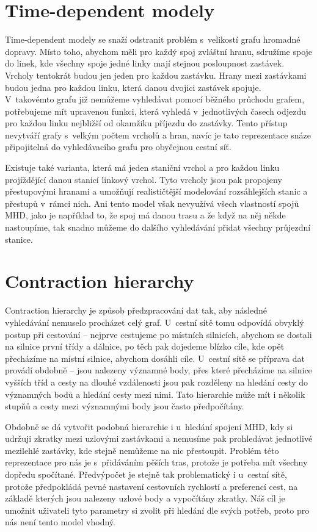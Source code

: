 \section{Time-dependent modely}
Time-dependent modely\cite{time-dependent} se snaží odstranit problém
s~velikostí grafu hromadné dopravy. Místo toho, abychom měli pro každý spoj
zvláštní hranu, sdružíme spoje do linek, kde všechny spoje jedné linky mají
stejnou posloupnost zastávek. Vrcholy tentokrát budou jen jeden pro každou
zastávku. Hrany mezi zastávkami budou jedna pro každou linku, která danou
dvojici zastávek spojuje. V~takovémto grafu již nemůžeme vyhledávat pomocí
běžného průchodu grafem, potřebujeme mít upravenou funkci, která vyhledá
v~jednotlivých časech odjezdu pro každou linku nejbližší od okamžiku příjezdu do
zastávky. Tento přístup nevytváří grafy s~velkým počtem vrcholů a hran, navíc je
tato reprezentace snáze připojitelná do vyhledávacího grafu pro obyčejnou cestní
síť.

Existuje také varianta, která má jeden staniční vrchol a
pro každou linku projíždějící danou stanicí linkový vrchol. Tyto vrcholy jsou
pak propojeny přestupovými hranami a umožňují realističtější modelování
rozsáhlejších stanic a přestupů v~rámci nich. Ani tento model však nevyužívá
všech vlastností spojů MHD, jako je například to, že spoj má danou trasu a že
když na něj někde nastoupíme, tak snadno můžeme do dalšího vyhledávání přidat všechny
průjezdní stanice.  

\section{Contraction hierarchy}
Contraction hierarchy\cite{CH} je způsob předzpracování dat tak, aby následné
vyhledávání nemuselo procházet celý graf. U~cestní sítě tomu odpovídá obvyklý
postup při cestování -- nejprve cestujeme po místních silnicích, abychom se
dostali na silnice první třídy a dálnice, po těch pak dojedeme blízko cíle, kde
opět přecházíme na místní silnice, abychom dosáhli cíle. U~cestní sítě se
příprava dat provádí obdobně -- jsou nalezeny významné body, přes které
přecházíme na silnice vyšších tříd a cesty na dlouhé vzdálenosti jsou pak
rozděleny na hledání cesty do významných bodů a hledání cesty mezi nimi. Tato
hierarchie může mít i několik stupňů a cesty mezi významnými body jsou často
předpočítány.

Obdobně se dá vytvořit podobná hierarchie i u~hledání spojení MHD, kdy si
udržuji zkratky mezi uzlovými zastávkami a nemusíme pak prohledávat jednotlivé
mezilehlé zastávky, kde stejně nemůžeme na nic přestoupit. Problém této
reprezentace pro nás je s~přidáváním pěších tras, protože je potřeba mít všechny dopředu
spočítané. Předvýpočet je stejně tak problematický i u~cestní sítě, protože
předpokládá pevné nastavení cestovních rychlostí a preferencí cest, na základě
kterých jsou nalezeny uzlové body a vypočítány zkratky. Náš cíl je umožnit
uživateli tyto parametry si zvolit při hledání dle svých potřeb, proto pro nás
není tento model vhodný. 

